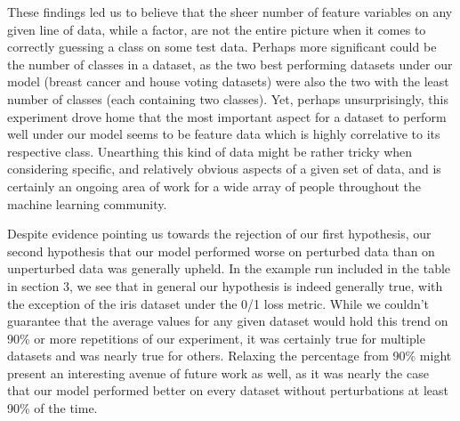 \documentclass[twoside,11pt]{article}
\begin{document}
These findings led us to believe that the sheer number of feature variables on any given line of data, while a factor, are not the entire picture when it comes to correctly guessing a class on some test data.
Perhaps more significant could be the number of classes in a dataset, as the two best performing datasets under our model (breast cancer and house voting datasets) were also the two with the least number of 
classes (each containing two classes). Yet, perhaps unsurprisingly, this experiment drove home that the most important aspect for a dataset to perform well under our model seems to be feature data which is 
highly correlative to its  respective class. Unearthing this kind of data might be rather tricky when considering specific, and relatively obvious aspects of a given set of data, and is certainly an ongoing area of 
work for a wide array of people throughout the machine learning community.

Despite evidence pointing us towards the rejection of our first hypothesis, our second hypothesis that our model performed worse on perturbed data than on unperturbed data was generally upheld. In 
the example run included in the table in section 3, we see that in general our hypothesis is indeed generally true, with the exception of the iris dataset under the 0/1 loss metric. While we 
couldn't guarantee that the average values for any given dataset would hold this trend on 90\% or more repetitions of our experiment, it was certainly true for multiple datasets and was nearly true for others.
Relaxing the percentage from 90\% might present an interesting avenue of future work as well, as it was nearly the case that our model performed better on every dataset without perturbations at least 90\% of
the time.






\vskip 0.2in

\end{document}
